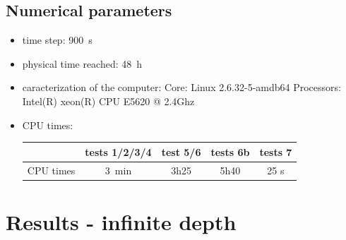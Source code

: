 \subsection{Numerical parameters}
\begin{itemize}
\item time step: 900~s
\item physical time reached: 48~h
\item caracterization of the computer: \subitem Core: Linux 2.6.32-5-amdb64
  \subitem Processors: Intel(R)
xeon(R) CPU E5620 @ 2.4Ghz
\item CPU times: \\
\begin{tabular}{ccccc}
\toprule
\toprule
& \textbf{tests 1/2/3/4} & \textbf{test 5/6} & \textbf{tests 6b} &
\textbf{tests 7}\\
\midrule
CPU times & 3~min & 3h25 & 5h40 & 25 s \\
\bottomrule
\bottomrule
\end{tabular}
\end{itemize}

\section{Results - infinite depth }
